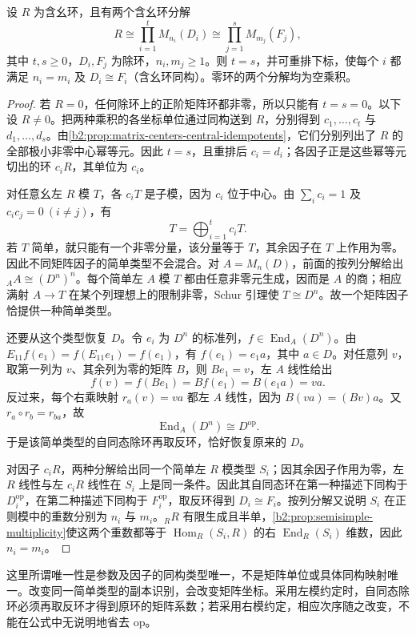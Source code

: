 \begin{corollary}\label{b2:cor:artin-wedderburn-uniqueness}
	设 \(R\) 为含幺环，且有两个含幺环分解
	\[
		R\cong\prod_{i=1}^tM_{n_i}(D_i) \cong\prod_{j=1}^sM_{m_j}(F_j),
	\]
	其中 \(t,s\ge0\)，\(D_i,F_j\) 为除环，\(n_i,m_j\ge1\)。则 \(t=s\)，并可重排下标，使每个 \(i\) 都满足 \(n_i=m_i\) 及 \(D_i\cong F_i\)（含幺环同构）。零环的两个分解均为空乘积。
\end{corollary}
\begin{proof}
	若 \(R=0\)，任何除环上的正阶矩阵环都非零，所以只能有 \(t=s=0\)。以下设 \(R\ne0\)。把两种乘积的各坐标单位通过同构送到 \(R\)，分别得到 \(c_1,\ldots,c_t\) 与 \(d_1,\ldots,d_s\)。由\cref{b2:prop:matrix-centers-central-idempotents}，它们分别列出了 \(R\) 的全部极小非零中心幂等元。因此 \(t=s\)，且重排后 \(c_i=d_i\)；各因子正是这些幂等元切出的环 \(c_iR\)，其单位为 \(c_i\)。

	对任意幺左 \(R\) 模 \(T\)，各 \(c_iT\) 是子模，因为 \(c_i\) 位于中心。由 \(\sum_i c_i=1\) 及 \(c_ic_j=0\ (i\ne j)\)，有
	\[
		T=\bigoplus_{i=1}^t c_iT.
	\]
	若 \(T\) 简单，就只能有一个非零分量，该分量等于 \(T\)，其余因子在 \(T\) 上作用为零。因此不同矩阵因子的简单类型不会混合。对 \(A=M_n(D)\)，前面的按列分解给出 \({}_AA\cong(D^n)^n\)。每个简单左 \(A\) 模 \(T\) 都由任意非零元生成，因而是 \(A\) 的商；相应满射 \(A\to T\) 在某个列理想上的限制非零，Schur 引理使 \(T\cong D^n\)。故一个矩阵因子恰提供一种简单类型。

	还要从这个类型恢复 \(D\)。令 \(e_i\) 为 \(D^n\) 的标准列，\(f\in\operatorname{End}_A(D^n)\)。由 \(E_{11}f(e_1)=f(E_{11}e_1)=f(e_1)\)，有 \(f(e_1)=e_1a\)，其中 \(a\in D\)。对任意列 \(v\)，取第一列为 \(v\)、其余列为零的矩阵 \(B\)，则 \(Be_1=v\)，左 \(A\) 线性给出
	\[
		f(v)=f(Be_1)=Bf(e_1)=B(e_1a)=va.
	\]
	反过来，每个右乘映射 \(r_a(v)=va\) 都左 \(A\) 线性，因为 \(B(va)=(Bv)a\)。又 \(r_a\circ r_b=r_{ba}\)，故
	\[
		\operatorname{End}_A(D^n)\cong D^{\mathrm{op}}.
	\]
	于是该简单类型的自同态除环再取反环，恰好恢复原来的 \(D\)。

	对因子 \(c_iR\)，两种分解给出同一个简单左 \(R\) 模类型 \(S_i\)；因其余因子作用为零，左 \(R\) 线性与左 \(c_iR\) 线性在 \(S_i\) 上是同一条件。因此其自同态环在第一种描述下同构于 \(D_i^{\mathrm{op}}\)，在第二种描述下同构于 \(F_i^{\mathrm{op}}\)，取反环得到 \(D_i\cong F_i\)。按列分解又说明 \(S_i\) 在正则模中的重数分别为 \(n_i\) 与 \(m_i\)。\({}_RR\) 有限生成且半单，\cref{b2:prop:semisimple-multiplicity}使这两个重数都等于 \(\operatorname{Hom}_R(S_i,R)\) 的右 \(\operatorname{End}_R(S_i)\) 维数，因此 \(n_i=m_i\)。
\end{proof}

这里所谓唯一性是参数及因子的同构类型唯一，不是矩阵单位或具体同构映射唯一。改变同一简单类型的副本识别，会改变矩阵坐标。采用左模约定时，自同态除环必须再取反环才得到原环的矩阵系数；若采用右模约定，相应次序随之改变，不能在公式中无说明地省去 \(\mathrm{op}\)。
